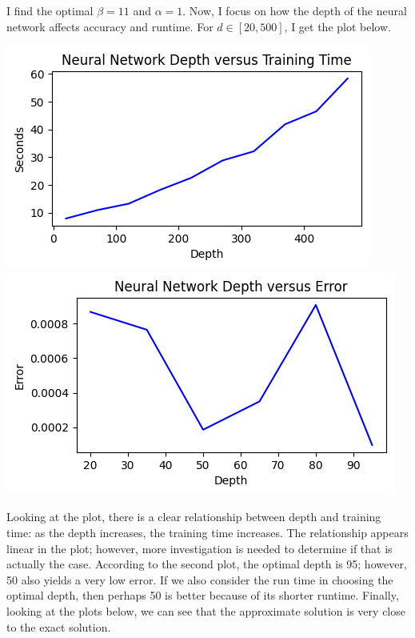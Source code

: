 \documentclass[12pt]{article}
\begin{document}
\begin{description}
    I find the optimal $\beta = 11$ and $\alpha=1$. Now, I focus on how the
    depth of the neural network affects accuracy and runtime. For $d\in[20,
    500]$, I get the plot below.  \\ 
    \begin{minipage}{\linewidth}
        \centering
        \includegraphics[scale=.5]{images/figure5.png}
        \includegraphics[scale=.5]{images/figure6.png}
    \end{minipage}
    Looking at the plot, there is a clear relationship between depth and
    training time: as the depth increases, the training time increases. The
    relationship appears linear in the plot; however, more investigation is
    needed to determine if that is actually the case. According to the second
    plot, the optimal depth is 95; however, 50 also yields a very low error. If
    we also consider the run time in choosing the optimal depth, then perhaps
    50 is better because of its shorter runtime. Finally, looking at the plots
    below, we can see that the approximate solution is very close to the exact
    solution. \\
    \begin{minipage}{\linewidth}

\end{minipage}
\end{description}
\end{document}
